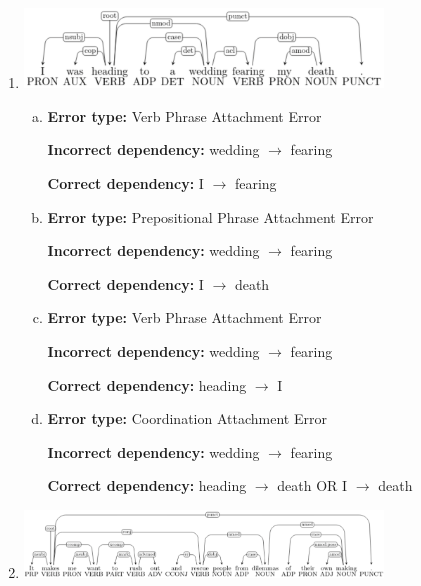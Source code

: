 \begin{enumerate}[1.]
\item {}

\begin{center}
\includegraphics[width=0.75\textwidth]{6-1.png}
\end{center}

\begin{enumerate}[(a)]
\item {\bf Error type:} Verb Phrase Attachment Error

{\bf Incorrect dependency:} wedding $\rightarrow$ fearing

{\bf Correct dependency:} I $\rightarrow$ fearing

\item {\bf Error type:} Prepositional Phrase Attachment Error

{\bf Incorrect dependency:} wedding $\rightarrow$ fearing

{\bf Correct dependency:} I $\rightarrow$ death

\item {\bf Error type:} Verb Phrase Attachment Error

{\bf Incorrect dependency:} wedding $\rightarrow$ fearing

{\bf Correct dependency:} heading $\rightarrow$ I

\item {\bf Error type:} Coordination Attachment Error

{\bf Incorrect dependency:} wedding $\rightarrow$ fearing

{\bf Correct dependency:} heading $\rightarrow$ death OR I $\rightarrow$ death

\end{enumerate}


\item {}

\begin{center}
\includegraphics[width=0.75\textwidth]{7-1.png}
\end{center}


\end{enumerate}
